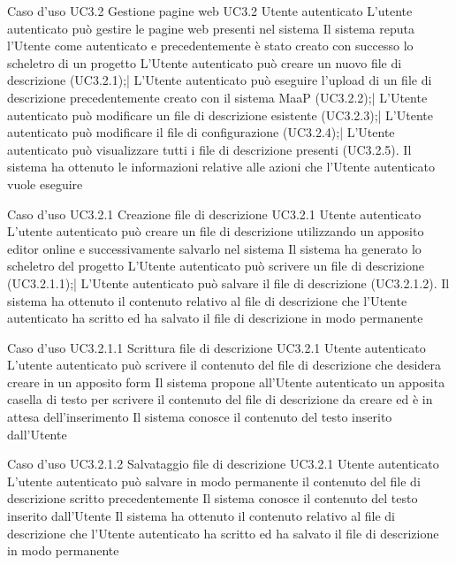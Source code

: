 \UCtitle
{Caso d'uso UC3.2}  
{Gestione pagine web}
\UC		
{UC3.2}		
{Utente autenticato}
{L'utente autenticato può gestire le pagine web presenti nel sistema}
{Il sistema reputa l'Utente come autenticato e precedentemente è stato creato con successo lo scheletro di un progetto}
\scenario
{L'Utente autenticato può creare un nuovo file di descrizione (UC3.2.1);|
L'Utente autenticato può eseguire l'upload di un file di descrizione precedentemente creato con il sistema MaaP (UC3.2.2);|
L'Utente autenticato può modificare un file di descrizione esistente (UC3.2.3);|
L'Utente autenticato può modificare il file di configurazione (UC3.2.4);|
L'Utente autenticato può visualizzare tutti i file di descrizione presenti (UC3.2.5).
}
\post
{Il sistema ha ottenuto le informazioni relative alle azioni che l'Utente autenticato vuole eseguire}


\UCtitle
{Caso d'uso UC3.2.1}  
{Creazione file di descrizione}	
\UC	
{UC3.2.1}		
{Utente autenticato}
{L'utente autenticato può creare un file di descrizione utilizzando un apposito editor online e successivamente salvarlo nel sistema}
{Il sistema ha generato lo scheletro del progetto}
\scenario
{L'Utente autenticato può scrivere un file di descrizione (UC3.2.1.1);|
L'Utente autenticato può salvare il file di descrizione (UC3.2.1.2).
}
\post
{Il sistema ha ottenuto il contenuto relativo al file di descrizione che l'Utente autenticato ha scritto ed ha salvato il file di descrizione in modo permanente}

\UCtitle
{Caso d'uso UC3.2.1.1}  
{Scrittura file di descrizione}	
\UC	
{UC3.2.1}		
{Utente autenticato}
{L'utente autenticato può scrivere il contenuto del file di descrizione che desidera creare in un apposito form}
{Il sistema propone all'Utente autenticato un apposita casella di testo per scrivere il contenuto del file di descrizione da creare ed è in attesa dell'inserimento}
\post
{Il sistema conosce il contenuto del testo inserito dall'Utente}

\UCtitle
{Caso d'uso UC3.2.1.2}  
{Salvataggio file di descrizione}
\UC		
{UC3.2.1}		
{Utente autenticato}
{L'utente autenticato può salvare in modo permanente il contenuto del file di descrizione scritto precedentemente}
{Il sistema conosce il contenuto del testo inserito dall'Utente}
\post
{Il sistema ha ottenuto il contenuto relativo al file di descrizione che l'Utente autenticato ha scritto ed ha salvato il file di descrizione in modo permanente}

